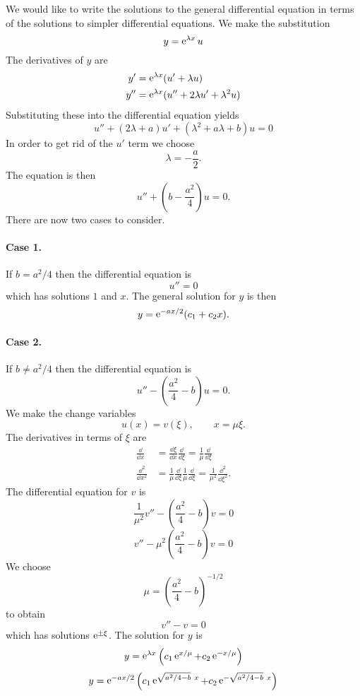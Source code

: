 We would like to write the solutions to the general differential equation
in terms of the solutions to simpler differential equations.
We make the substitution
\[
y = \mathop{\mathrm{e}}\nolimits^{\lambda x} u
\]
The derivatives of $y$ are
\begin{align*}
  y'      &= \mathop{\mathrm{e}}\nolimits^{\lambda x} (u' + \lambda u) \\
  y''     &= \mathop{\mathrm{e}}\nolimits^{\lambda x} (u'' + 2 \lambda u' + \lambda^2 u)
\end{align*}
Substituting these into the differential equation yields
\[
u'' + (2 \lambda + a) u' + (\lambda^2 + a \lambda + b) u = 0
\]
In order to get rid of the $u'$ term we choose
\[
\lambda = - \frac{a}{2}.
\]
The equation is then
\[
u'' + \left( b - \frac{a^2}{4} \right) u = 0.
\]
There are now two cases to consider.

\paragraph{Case 1.}
If $b = a^2 / 4$ then the differential equation is
\[
u'' = 0
\]
which has solutions $1$ and $x$.  The general solution for $y$ is then
\[
y = \mathop{\mathrm{e}}\nolimits^{-ax / 2} (c_1 + c_2 x).
\]


\paragraph{Case 2.}
If $b \neq a^2 / 4$ then the differential equation is
\[
u'' - \left( \frac{a^2}{4} - b\right) u = 0.
\]
We make the change variables
\[
u(x) = v(\xi), \qquad x = \mu \xi.
\]
The derivatives in terms of $\xi$ are
\begin{align*}
  \frac{\dd}{\dd x} &= \frac{\dd \xi}{\dd x} \frac{\dd}{\dd \xi} = \frac{1}{\mu}\frac{\dd}{\dd \xi} \\
  \frac{\dd^2}{\dd x^2} &=  \frac{1}{\mu}\frac{\dd}{\dd \xi}  \frac{1}{\mu}\frac{\dd}{\dd \xi}
  = \frac{1}{\mu^2} \frac{\dd^2}{\dd \xi^2}.
\end{align*}
The differential equation for $v$ is
\[
\frac{1}{\mu^2} v'' - \left( \frac{a^2}{4} - b\right) v = 0
\]
\[
v'' - \mu^2 \left( \frac{a^2}{4} - b\right) v = 0
\]
We choose
\[
\mu = \left( \frac{a^2}{4} - b\right)^{-1/2}
\]
to obtain
\[
v'' - v = 0
\]
which has solutions $\mathop{\mathrm{e}}\nolimits^{\pm \xi}$.
The solution for $y$ is
\[
y = \mathop{\mathrm{e}}\nolimits^{\lambda x} \left( c_1 \mathop{\mathrm{e}}\nolimits^{x/\mu} + c_2 \mathop{\mathrm{e}}\nolimits^{-x / \mu}\right)
\]
\[
y = \mathop{\mathrm{e}}\nolimits^{-ax/2} \left( c_1 \mathop{\mathrm{e}}\nolimits^{\sqrt{a^2 /4 - b}\ x}
  + c_2 \mathop{\mathrm{e}}\nolimits^{-\sqrt{a^2 / 4 - b}\ x} \right)
\]








